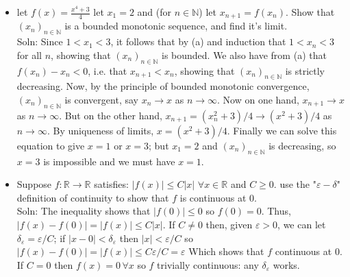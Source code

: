 \documentclass[10pt]{article}
\begin{document}
\begin{multicols}{2}
\begin{itemize}
    \item let $f(x)=\frac{x^{4}+3}{4}$ let $x_{1}=2$ and (for $n\in\mathbb{N}$) let $x_{n+1}=f(x_{n})$. Show that $(x_{n})_{n\in\mathbb{N}}$ is a bounded monotonic sequence, and find it's limit.\\
    Soln: Since $1<x_{1}<3$, it follows that by (a) and induction that $1<x_{n}<3$ for all $n$, showing that $(x_{n})_{n\in\mathbb{N}}$ is bounded. We also have from (a) that $f(x_{n})-x_{n}<0$, i.e. that $x_{n+1}<x_{n}$, showing that $(x_{n})_{n\in\mathbb{N}}$ is strictly decreasing. Now, by the principle of bounded monotonic convergence, $(x_{n})_{n\in\mathbb{N}}$ is convergent, say $x_{n}\to x$ as $n\to\infty$. Now on one hand, $x_{n+1}\to x$ as $n\to\infty$. But on the other hand, $x_{n+1}=(x^{2}_{n}+3)/4\to(x^{2}+3)/4$ as $n\to\infty$. By uniqueness of limits, $x=(x^{2}+3)/4$. Finally we can solve this equation to give $x=1$ or $x=3$; but $x_{1}=2$ and $(x_{n})_{n\in\mathbb{N}}$ is decreasing, so $x=3$ is impossible and we must have $x=1$.
    \item Suppose $f:\mathbb{R}\to\mathbb{R}$ satisfies: $|f(x)|\leq C|x|$ $\forall x\in\mathbb{R}$ and $C\geq0$. use the "$\varepsilon-\delta$" definition of continuity to show that $f$ is continuous at 0.\\
    Soln: The inequality shows that $|f(0)|\leq0$ so $f(0)=0$. Thus, $|f(x)-f(0)|=|f(x)|\leq C|x|$. If $C\neq0$ then, given $\varepsilon>0$, we can let $\delta_{\varepsilon}=\varepsilon/C$; if $|x-0|<\delta_{\varepsilon}$ then $|x|<\varepsilon/C$ so $|f(x)-f(0)|=|f(x)|\leq C\varepsilon/C=\varepsilon$ Which shows that $f$ continuous at 0. If $C=0$ then $f(x)=0\,\forall x$ so $f$ trivially continuous: any $\delta_{\varepsilon}$ works.
\end{itemize}
\end{multicols}
\end{document}
